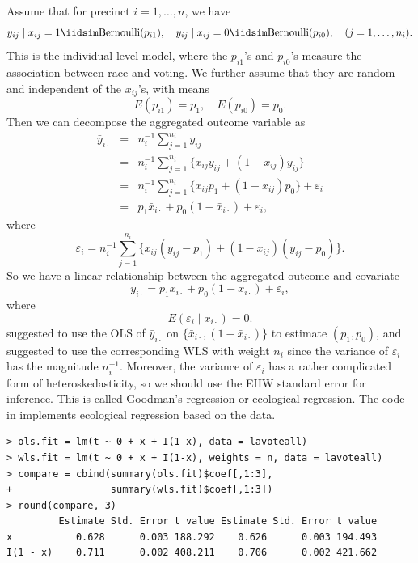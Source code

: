 Assume that for precinct $i = 1,\ldots, n$, we have
$$
y_{ij} \mid x_{ij} = 1 \iidsim \text{Bernoulli}(p_{i1}),\quad
y_{ij} \mid x_{ij} = 0 \iidsim \text{Bernoulli}(p_{i0}),\quad 
(j = 1, \ldots, n_i) . 
$$
This is the individual-level model, where the $p_{i1}$'s and $p_{i0}$'s measure the association between race and voting.
We further assume that they are random and independent of the $x_{ij}$'s, with means
\begin{equation}\label{eq::ecological-assumption-1}
E( p_{i1} ) = p_1,\quad
E( p_{i0} ) = p_0.
\end{equation}
Then we can decompose the aggregated outcome variable as 
\begin{eqnarray*}
\bar{y}_{i\cdot} &=&  n_i^{-1} \sum_{j=1}^{n_i}  y_{ij}  \\
&=&n_i^{-1} \sum_{j=1}^{n_i}   \{  x_{ij}  y_{ij}  + (1-x_{ij}) y_{ij}  \} \\
&=& n_i^{-1} \sum_{j=1}^{n_i}   \{  x_{ij}  p_{1}  + (1-x_{ij}) p_0  \}  + \varepsilon_i  \\
&=&  p_1 \bar{x}_{i\cdot}   + p_0 (1 -\bar{x}_{i\cdot} ) + \varepsilon_i,
\end{eqnarray*} 
where
$$
\varepsilon_i = n_i^{-1} \sum_{j=1}^{n_i}   \{  x_{ij}  (y_{ij} - p_{1} )   + (1-x_{ij}) ( y_{ij} -  p_0 ) \}.
$$
So we have a linear relationship between the aggregated outcome and covariate
$$
\bar{y}_{i\cdot}  = p_1 \bar{x}_{i\cdot}   + p_0 (1 -\bar{x}_{i\cdot} ) + \varepsilon_i,
$$
where 
$$
E(\varepsilon_i  \mid \bar{x}_{i\cdot}  ) = 0.
$$
\citet{goodman1953ecological} suggested to use the OLS of $\bar{y}_{i\cdot} $ on $\{ \bar{x}_{i\cdot}, (1 -\bar{x}_{i\cdot} )\}$ to estimate $(p_1, p_0)$, and \citet{goodman1959some} suggested to use the corresponding WLS with weight $n_i$ since the variance of $\varepsilon_i$ has the magnitude $n_i^{-1}$. Moreover, the variance of $\varepsilon_i$ has a rather complicated form of heteroskedasticity, so we should use the EHW standard error for inference. This is called Goodman's regression or ecological regression. The  code in  implements ecological regression based on the  data. 



\begin{lstlisting}
> ols.fit = lm(t ~ 0 + x + I(1-x), data = lavoteall)
> wls.fit = lm(t ~ 0 + x + I(1-x), weights = n, data = lavoteall)
> compare = cbind(summary(ols.fit)$coef[,1:3], 
+                 summary(wls.fit)$coef[,1:3])
> round(compare, 3)
         Estimate Std. Error t value Estimate Std. Error t value
x           0.628      0.003 188.292    0.626      0.003 194.493
I(1 - x)    0.711      0.002 408.211    0.706      0.002 421.662
\end{lstlisting}


